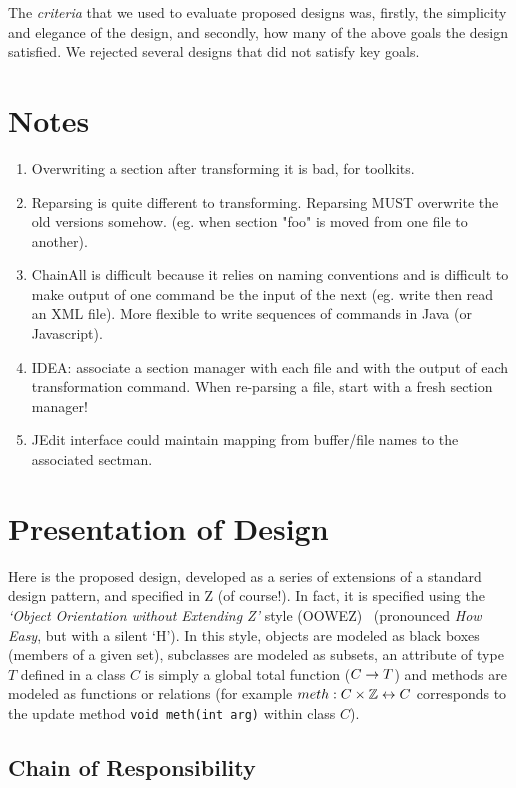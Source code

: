 \documentclass{llncs} %
\begin{document}
The \emph{criteria} that we used to evaluate proposed
designs was, firstly, the simplicity and elegance of the design,
and secondly, how many of the above goals the design satisfied.
We rejected several designs that did not satisfy key goals.

\section{Notes}

\begin{enumerate}
\item Overwriting a section after transforming it is bad, for toolkits.
\item Reparsing is quite different to transforming.  Reparsing MUST
  overwrite the old versions somehow.  (eg. when section "foo" is
  moved from one file to another).
\item ChainAll is difficult because it relies on naming conventions
  and is difficult to make output of one command be the input of the
  next (eg. write then read an XML file).  More flexible to write
  sequences of commands in Java (or Javascript).
\item IDEA: associate a section manager with each file and
  with the output of each transformation command.  When re-parsing
  a file, start with a fresh section manager!
\item JEdit interface could maintain mapping from buffer/file names 
  to the associated sectman.
\end{enumerate}

\section{Presentation of Design}

Here is the proposed design, developed as a series of extensions of a 
standard design pattern, and specified in Z (of course!).
In fact, it is specified using the \emph{`Object Orientation without
  Extending Z'} style (OOWEZ)~\cite{utting:oo-z03} (pronounced \emph{How
  Easy}, but with a silent `H').
In this style, objects are modeled as black boxes (members of a given set),
subclasses are modeled as subsets, an attribute of type $T$ defined
in a class $C$ is simply a global total function ($C \fun T$) and
methods are modeled as functions or relations (for example $meth : C \cross
\num \rel C$ corresponds to the update method \texttt{void meth(int arg)}
within class $C$).

\subsection{Chain of Responsibility}
\end{document}
